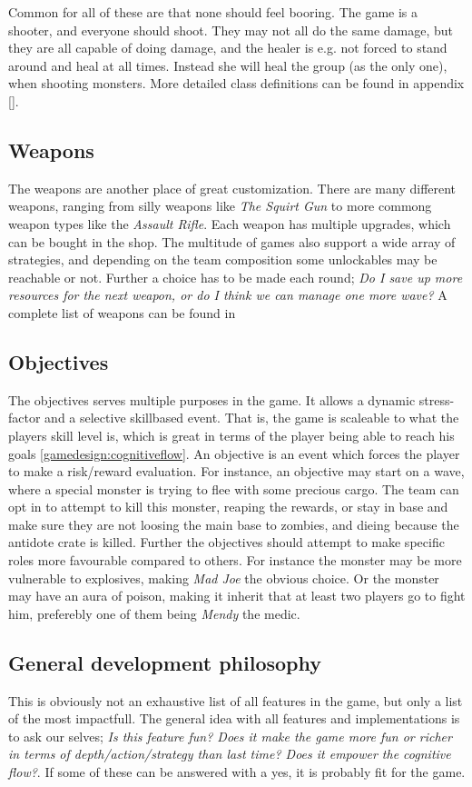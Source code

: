 Common for all of these are that none should feel booring. The game is a shooter, and everyone should shoot. They may not all do the same damage, but they are all capable of doing damage, and the healer is e.g. not forced to stand around and heal at all times. Instead she will heal the group (as the only one), when shooting monsters. More detailed class definitions can be found in appendix \ref{}. 

\subsection*{Weapons}\label{gamedesign:ourgame:weapons}
The weapons are another place of great customization. There are many different weapons, ranging from silly weapons like \emph{The Squirt Gun} to more commong weapon types like the \emph{Assault Rifle}. Each weapon has multiple upgrades, which can be bought in the shop. The multitude of games also support a wide array of strategies, and depending on the team composition some unlockables may be reachable or not. Further a choice has to be made each round; \emph{Do I save up more resources for the next weapon, or do I think we can manage one more wave?} A complete list of weapons can be found in \appendix{} 

\subsection*{Objectives}\label{gamedesign:ourgame:objectives}
The objectives serves multiple purposes in the game. It allows a dynamic stress-factor and a selective skillbased event. That is, the game is scaleable to what the players skill level is, which is great in terms of the player being able to reach his goals \ref{gamedesign:cognitiveflow}. An objective is an event which forces the player to make a risk/reward evaluation. For instance, an objective may start on a wave, where a special monster is trying to flee with some precious cargo. The team can opt in to attempt to kill this monster, reaping the rewards, or stay in base and make sure they are not loosing the main base to zombies, and dieing because the antidote crate is killed. Further the objectives should attempt to make specific roles more favourable compared to others. For instance the monster may be more vulnerable to explosives, making \emph{Mad Joe} the obvious choice. Or the monster may have an aura of poison, making it inherit that at least two players go to fight him, preferebly one of them being \emph{Mendy} the medic. 

\subsection*{General development philosophy}
This is obviously not an exhaustive list of all features in the game, but only a list of the most impactfull. The general idea with all features and implementations is to ask our selves; \emph{Is this feature fun? Does it make the game more fun or richer in terms of depth/action/strategy than last time? Does it empower the cognitive flow?}. If some of these can be answered with a yes, it is probably fit for the game. 
